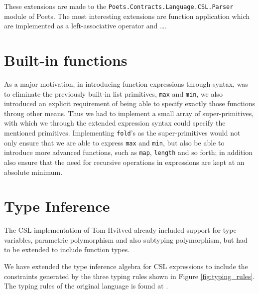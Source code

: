 \documentclass[10pt,a4paper,final,oneside,openany,article]{memoir}
\begin{document}
These extensions are made to the
\texttt{Poets.Contracts.Language.CSL.Parser} module of Poets. The most
interesting extensions are function application which are implemented
as a left-associative operator and \ldots.  

\section{Built-in functions}
As a major motivation, in introducing function expressions through
syntax, was to eliminate the previously built-in list primitives,
\lstinline{max} and \lstinline{min}, we also introduced an explicit
requirement of being able to specify exactly those functions throug
other means. Thus we had to implement a small array of super-primitives,
with which we through the extended expression syntax could specify the
mentioned primitives. Implementing \lstinline{fold}'s as the
super-primitives would not only ensure that we are able to express 
\lstinline{max} and \lstinline{min}, but also be able to introduce more
advanced functions, such as \lstinline{map}, \lstinline{length} and so 
forth; in addition also ensure that the need for recursive operations
in expressions are kept at an absolute minimum.

\section{Type Inference}
The CSL implementation of Tom Hvitved already included support for
type variables, parametric polymorphism and also subtyping
polymorphism, but had to be extended to include function types.

We have extended the type inference algebra for CSL expressions to
include the constraints generated by the three typing
rules shown in Figure \ref{fig:typing_rules}. The typing rules of the
original language is found at \cite[page 17, Figure 3]{hvitved10}.  
\end{document}

